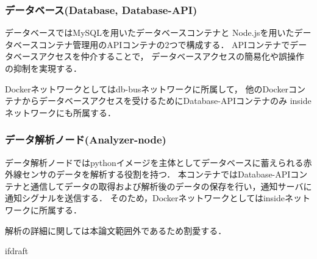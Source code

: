 \documentclass[12pt]{honka_v1}
\begin{document}
\subsubsection{データベース(Database, Database-API)}
データベースではMySQLを用いたデータベースコンテナと
Node.jsを用いたデータベースコンテナ管理用のAPIコンテナの2つで構成する．
APIコンテナでデータベースアクセスを仲介することで，
データベースアクセスの簡易化や誤操作の抑制を実現する．

Dockerネットワークとしてはdb-busネットワークに所属して，
他のDockerコンテナからデータベースアクセスを受けるためにDatabase-APIコンテナのみ
insideネットワークにも所属する．


\subsubsection{データ解析ノード(Analyzer-node)}
データ解析ノードではpythonイメージを主体としてデータベースに蓄えられる赤外線センサのデータを解析する役割を持つ．
本コンテナではDatabase-APIコンテナと通信してデータの取得および解析後のデータの保存を行い，通知サーバに通知シグナルを送信する．
そのため，Dockerネットワークとしてはinsideネットワークに所属する．

解析の詳細に関しては本論文範囲外であるため割愛する．











\expandafter\ifx\csname ifdraft\endcsname\relax
    \newcommand{\ifdraft}{false}
    
    
\end{document}

